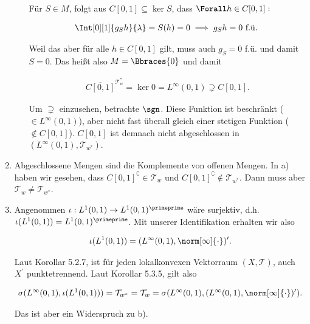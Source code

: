 \begin{solution}
\begin{enumerate}[label = \alph*)]
\begin{itemize}
    Für $S \in M$, folgt aus $C[0,1] \subseteq \ker S$, dass $\Forall h \in C[0, 1]:$

    \begin{align*}
      \Int[0][1]{g_S h}{\lambda} = S(h) = 0
      \implies
      g_S h = 0 ~\text{f.ü.}~
    \end{align*}

    Weil das aber für alle $h \in C[0, 1]$ gilt, muss auch $g_S = 0$ f.ü. und damit $S = 0$.
    Das heißt also $M = \Bbraces{0}$ und damit

    \begin{align*}
      \overline{C[0, 1]}^{\mathcal{T}_w^\ast}
      =
      \ker 0
      =
      L^\infty(0, 1)
      \supsetneq
      C[0, 1].
    \end{align*}

    Um $\supsetneq$ einzusehen, betrachte $\sgn$.
    Diese Funktion ist beschränkt ($\in L^\infty(0, 1)$), aber nicht fast überall gleich einer stetigen
    Funktion ($\notin C[0, 1]$).
    $C[0,1]$ ist demnach nicht abgeschlossen in $(L^\infty(0, 1), \mathcal{T}_{w^\ast})$.
  \end{itemize}

  \item

  Abgeschlossene Mengen sind die Komplemente von offenen Mengen.
  In a) haben wir gesehen, dass $C[0, 1]^\complement \in \mathcal{T}_w$ und $C[0,1]^{\complement} \notin \mathcal{T}_{w^\ast}$.
  Dann muss aber $\mathcal{T}_w \neq \mathcal{T}_{w^\ast}$.

  \item

  Angenommen $\iota: L^1(0, 1) \rightarrow L^1(0, 1)^\primeprime$ wäre surjektiv, d.h. $\iota(L^1(0, 1)) = L^1(0, 1)^\primeprime$.
  Mit unserer Identifikation erhalten wir also

  \begin{align*}
    \iota(L^1(0, 1))
    =
    (L^\infty(0, 1), \norm[\infty]{\cdot})^\prime.
  \end{align*}

  Laut Korollar 5.2.7, ist für jeden lokalkonvexen Vektorraum $(X, \mathcal{T})$, auch $X^\prime$ punktetrennend.
  Laut Korollar 5.3.5, gilt also

  \begin{align*}
    \sigma(L^\infty(0, 1),\iota(L^1(0, 1)))
    =
    \mathcal{T}_{w^\ast}
    =
    \mathcal{T}_w
    =
    \sigma
    (
      L^\infty(0, 1),
      (L^\infty(0, 1), \norm[\infty]{\cdot})^\prime
    ).
  \end{align*}

  Das ist aber ein Widerspruch zu b).

\end{enumerate}

\end{solution}
